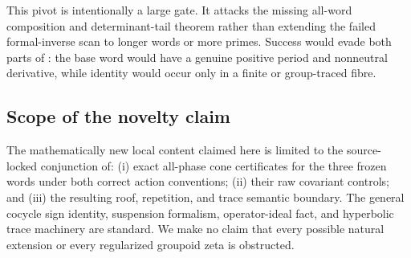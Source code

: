 This pivot is intentionally a large gate.  It attacks the missing all-word
composition and determinant-tail theorem rather than extending the failed
formal-inverse scan to longer words or more primes.  Success would evade both
parts of : the base word would have a genuine
positive period and nonneutral derivative, while identity would occur only
in a finite or group-traced fibre.

\subsection{Scope of the novelty claim}

The mathematically new local content claimed here is limited to the
source-locked conjunction of: (i) exact all-phase cone certificates for the
three frozen words under both correct action conventions; (ii) their raw
covariant controls; and (iii) the resulting roof, repetition, and trace
semantic boundary.  The general cocycle sign identity, suspension formalism,
operator-ideal fact, and hyperbolic trace machinery are standard.  We make no
claim that every possible natural extension or every regularized groupoid
zeta is obstructed.
